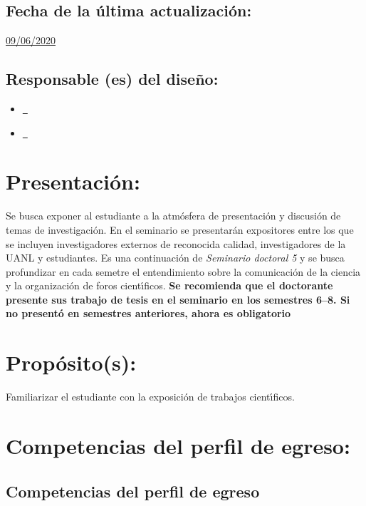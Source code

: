 \documentclass[10 pt]{article}
\begin{document}
\subsection{Fecha de la \'{u}ltima actualizaci\'{o}n:} \underline{09/06/2020}
\subsection{Responsable (es) del dise\~{n}o:}
\begin{itemize}[label={}]
\item \underline{\ncesar~\cesar}
\item \underline{\nelisa~\elisa}
\end{itemize}
\newpage
\section{Presentaci\'{o}n:}

Se busca exponer al estudiante a la atm\'{o}sfera de presentaci\'{o}n
y discusi\'{o}n de temas de investigaci\'{o}n. En el seminario se
presentar\'{a}n expositores entre los que se incluyen investigadores
externos de reconocida calidad, investigadores de la UANL y
estudiantes. Es una continuaci\'{o}n de {\em Seminario doctoral 5} y
se busca profundizar en cada semetre el entendimiento sobre la
comunicaci\'{o}n de la ciencia y la organizaci\'{o}n de foros
cient\'{\i}ficos. {\bf Se recomienda que el doctorante presente sus
  trabajo de tesis en el seminario en los semestres 6--8. Si no
  presentó en semestres anteriores, ahora es obligatorio}


\section{Prop\'{o}sito(s):}

Familiarizar el estudiante con la exposici\'{o}n de trabajos cient\'{\i}ficos.


\section{Competencias del perfil de egreso:}
\subsection{Competencias del perfil de egreso}






  
\end{document}
